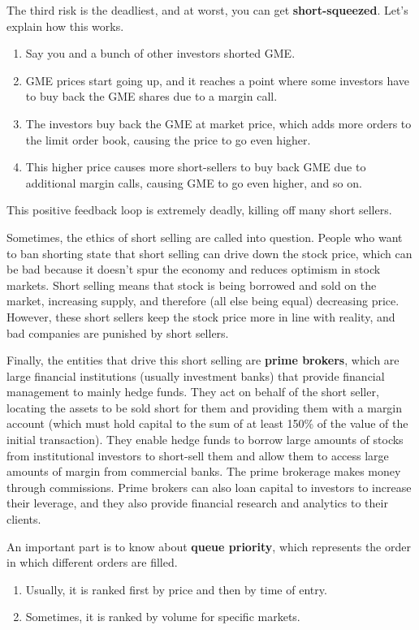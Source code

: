 \documentclass{article}
\begin{document}
    \begin{definition}
      The third risk is the deadliest, and at worst, you can get \textbf{short-squeezed}. Let's explain how this works. 
      \begin{enumerate}
        \item Say you and a bunch of other investors shorted GME. 
        \item GME prices start going up, and it reaches a point where some investors have to buy back the GME shares due to a margin call. 
        \item The investors buy back the GME at market price, which adds more orders to the limit order book, causing the price to go even higher.
        \item This higher price causes more short-sellers to buy back GME due to additional margin calls, causing GME to go even higher, and so on.
      \end{enumerate}
      This positive feedback loop is extremely deadly, killing off many short sellers. 
    \end{definition}

    Sometimes, the ethics of short selling are called into question. People who want to ban shorting state that short selling can drive down the stock price, which can be bad because it doesn't spur the economy and reduces optimism in stock markets. Short selling means that stock is being borrowed and sold on the market, increasing supply, and therefore (all else being equal) decreasing price. However, these short sellers keep the stock price more in line with reality, and bad companies are punished by short sellers. 

    Finally, the entities that drive this short selling are \textbf{prime brokers}, which are large financial institutions (usually investment banks) that provide financial management to mainly hedge funds. They act on behalf of the short seller, locating the assets to be sold short for them and providing them with a margin account (which must hold capital to the sum of at least 150\% of the value of the initial transaction). They enable hedge funds to borrow large amounts of stocks from institutional investors to short-sell them and allow them to access large amounts of margin from commercial banks. The prime brokerage makes money through commissions. Prime brokers can also loan capital to investors to increase their leverage, and they also provide financial research and analytics to their clients. 

    \begin{definition}
      An important part is to know about \textbf{queue priority}, which represents the order in which different orders are filled. 
      \begin{enumerate}
        \item Usually, it is ranked first by price and then by time of entry. 
        \item Sometimes, it is ranked by volume for specific markets. 
      \end{enumerate}
    \end{definition}
\end{document}
